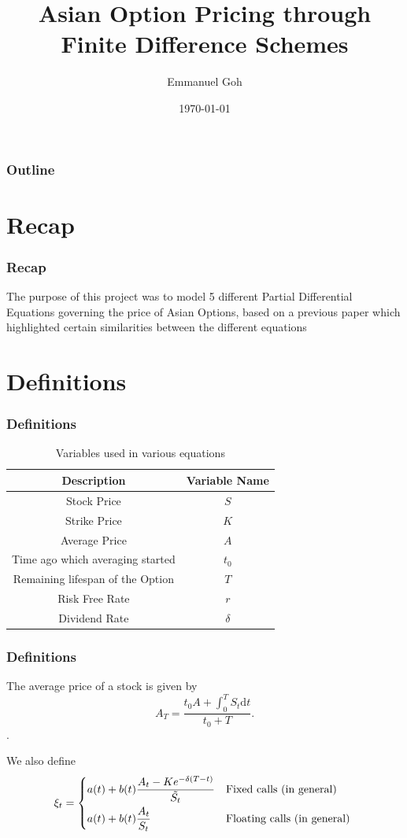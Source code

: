 \documentclass{beamer}
\title{Asian Option Pricing through Finite Difference Schemes}
\author{Emmanuel Goh}
\date{\today}
\begin{document}
  \begin{frame}
    \titlepage
  \end{frame}

  \begin{frame}
    \frametitle{Outline}
    \tableofcontents
  \end{frame}

  \section{Recap}
  \begin{frame}
    \frametitle{Recap}
    The purpose of this project was to model 5 different Partial Differential Equations governing the price of Asian Options, based on a previous paper which highlighted certain similarities between the different equations
  \end{frame}

  \section{Definitions}
  \begin{frame}
    \frametitle{Definitions}
    \begin{table}[h]
    \begin{tabular}{|c|c|}
      \hline
      \textbf{Description} & \textbf{Variable Name} \\ \hline
      Stock Price & \(S\) \\
      Strike Price & \(K\)\\
      Average Price & \(A\) \\
      Time ago which averaging started & \(t_0\) \\
      Remaining lifespan of the Option & \(T\) \\
      Risk Free Rate & \(r\) \\
      Dividend Rate & \(\delta\) \\
      \hline
    \end{tabular}
    \caption{Variables used in various equations}
    \label{table:name}
    \end{table}
  \end{frame}

  \begin{frame}
    \frametitle{Definitions}
    The average price of a stock is given by
    \begin{equation}
      A_T = \frac{t_0A + \int_0^T S_t \mathrm{d}t}{t_0 + T}.
    \end{equation}.

    We also define
    \begin{equation}
      \xi_t = 
      \begin{dcases*}
        a(t) + b(t) \frac{A_t - Ke^{-\delta(T-t)}}{\tilde{S_t}} & Fixed calls (in general) \\
        a(t) + b(t) \frac{A_t}{S_t} & Floating calls (in general)
      \end{dcases*}
    \end{equation}
  \end{frame}
\end{document}
